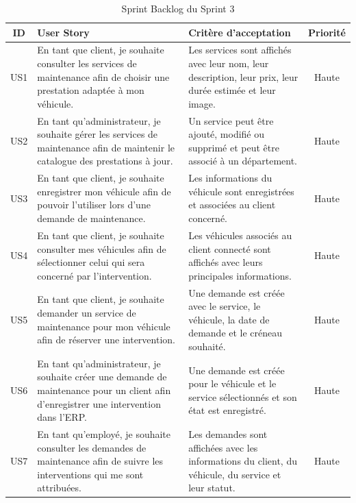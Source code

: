 \begin{longtable}{|c|p{5cm}|p{5cm}|c|}
\caption{Sprint Backlog du Sprint 3}
\label{tab:sprint3-backlog}\\
    \hline
\textbf{ID} & \textbf{User Story} & \textbf{Critère d'acceptation} & \textbf{Priorité} \\ \hline

US1 &
En tant que client, je souhaite consulter les services de maintenance afin de choisir une prestation adaptée à mon véhicule. &
Les services sont affichés avec leur nom, leur description, leur prix, leur durée estimée et leur image. &
Haute \\ \hline

US2 &
En tant qu'administrateur, je souhaite gérer les services de maintenance afin de maintenir le catalogue des prestations à jour. &
Un service peut être ajouté, modifié ou supprimé et peut être associé à un département. &
Haute \\ \hline

US3 &
En tant que client, je souhaite enregistrer mon véhicule afin de pouvoir l'utiliser lors d'une demande de maintenance. &
Les informations du véhicule sont enregistrées et associées au client concerné. &
Haute \\ \hline

US4 &
En tant que client, je souhaite consulter mes véhicules afin de sélectionner celui qui sera concerné par l'intervention. &
Les véhicules associés au client connecté sont affichés avec leurs principales informations. &
Haute \\ \hline

US5 &
En tant que client, je souhaite demander un service de maintenance pour mon véhicule afin de réserver une intervention. &
Une demande est créée avec le service, le véhicule, la date de demande et le créneau souhaité. &
Haute \\ \hline

US6 &
En tant qu'administrateur, je souhaite créer une demande de maintenance pour un client afin d'enregistrer une intervention dans l'ERP. &
Une demande est créée pour le véhicule et le service sélectionnés et son état est enregistré. &
Haute \\ \hline

US7 &
En tant qu'employé, je souhaite consulter les demandes de maintenance afin de suivre les interventions qui me sont attribuées. &
Les demandes sont affichées avec les informations du client, du véhicule, du service et leur statut. &
Haute \\ \hline


\end{longtable}
